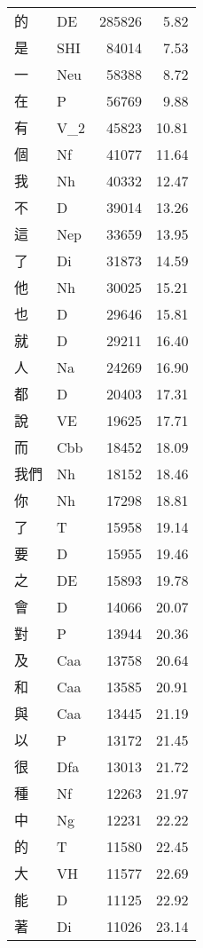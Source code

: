 \documentclass[twocolumn]{book}
\begin{document}
\twocolumn
\pagestyle{fancy}
\rhead{\thepage}
\rhead[\thepage]{\thepage}
\cfoot{}
\begin{supertabular}{llrr}
的 & DE & 285826 &   5.82\\
是 & SHI & 84014 &   7.53\\
一 & Neu & 58388 &   8.72\\
在 & P & 56769 &   9.88\\
有 & V\_2 & 45823 &  10.81\\
個 & Nf & 41077 &  11.64\\
我 & Nh & 40332 &  12.47\\
不 & D & 39014 &  13.26\\
這 & Nep & 33659 &  13.95\\
了 & Di & 31873 &  14.59\\
他 & Nh & 30025 &  15.21\\
也 & D & 29646 &  15.81\\
就 & D & 29211 &  16.40\\
人 & Na & 24269 &  16.90\\
都 & D & 20403 &  17.31\\
說 & VE & 19625 &  17.71\\
而 & Cbb & 18452 &  18.09\\
我們 & Nh & 18152 &  18.46\\
你 & Nh & 17298 &  18.81\\
了 & T & 15958 &  19.14\\
要 & D & 15955 &  19.46\\
之 & DE & 15893 &  19.78\\
會 & D & 14066 &  20.07\\
對 & P & 13944 &  20.36\\
及 & Caa & 13758 &  20.64\\
和 & Caa & 13585 &  20.91\\
與 & Caa & 13445 &  21.19\\
以 & P & 13172 &  21.45\\
很 & Dfa & 13013 &  21.72\\
種 & Nf & 12263 &  21.97\\
中 & Ng & 12231 &  22.22\\
的 & T & 11580 &  22.45\\
大 & VH & 11577 &  22.69\\
能 & D & 11125 &  22.92\\
著 & Di & 11026 &  23.14\\

\end{supertabular}
\end{document}

